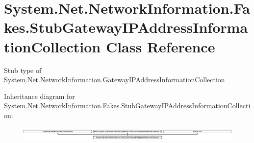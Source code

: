\hypertarget{class_system_1_1_net_1_1_network_information_1_1_fakes_1_1_stub_gateway_i_p_address_information_collection}{\section{System.\-Net.\-Network\-Information.\-Fakes.\-Stub\-Gateway\-I\-P\-Address\-Information\-Collection Class Reference}
\label{class_system_1_1_net_1_1_network_information_1_1_fakes_1_1_stub_gateway_i_p_address_information_collection}
}


Stub type of System.\-Net.\-Network\-Information.\-Gateway\-I\-P\-Address\-Information\-Collection 


Inheritance diagram for System.\-Net.\-Network\-Information.\-Fakes.\-Stub\-Gateway\-I\-P\-Address\-Information\-Collection\-:\begin{figure}[H]
\begin{center}
\leavevmode
\includegraphics[height=0.726329cm]{class_system_1_1_net_1_1_network_information_1_1_fakes_1_1_stub_gateway_i_p_address_information_collection}
\end{center}
\end{figure}
